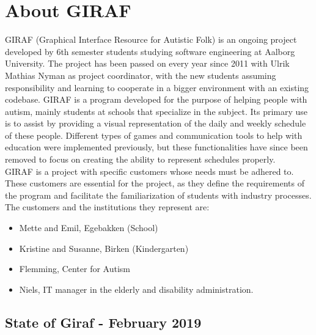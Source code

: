 \section{About GIRAF}
GIRAF (Graphical Interface Resource for Autistic Folk) is an ongoing project developed by 6th semester students studying software engineering at Aalborg University. 
The project has been passed on every year since 2011 with Ulrik Mathias Nyman as project coordinator, with the new students assuming responsibility and learning to cooperate in a bigger environment with an existing codebase. 
GIRAF is a program developed for the purpose of helping people with autism, mainly students at schools that specialize in the subject.
Its primary use is to assist by providing a visual representation of the daily and weekly schedule of these people.
Different types of games and communication tools to help with education were implemented previously, but these functionalities have since been removed to focus on creating the ability to represent schedules properly.
\\
GIRAF is a project with specific customers whose needs must be adhered to. 
These customers are essential for the project, as they define the requirements of the program and facilitate the familiarization of students with industry processes.
The customers and the institutions they represent are: 
\begin{itemize}
    \item Mette and Emil, Egebakken (School)
    \item Kristine and Susanne, Birken (Kindergarten)
    \item Flemming, Center for Autism
    \item Niels, IT manager in the elderly and disability administration.
\end{itemize}

\subsection{State of Giraf - February 2019}
